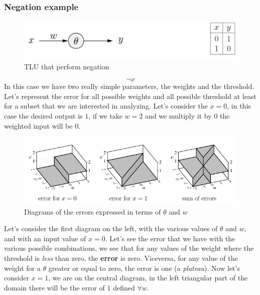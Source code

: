 \documentclass{article}
\begin{document}
\subsubsection{Negation example}
\begin{figure}[H]
    \centering
    \includegraphics[scale=1]{images/neg_example.png}
    \caption{TLU that perform negation}
    \label{fig:neg_example}
\end{figure}
$$\neg x$$
In this case we have two really simple parameters, the weights and the threshold.
Let’s represent the error for all possible weights and all possible threshold at least
for a subset that we are interested in analyzing. Let’s consider the $x=0$, in this case
the desired output is $1$, if we take $w=2$ and we multiply it by $0$ the weighted input
will be $0$.
\begin{figure}[H]
    \centering
    \includegraphics[scale=0.7]{images/errors_exampl.png}
    \caption{Diagrams of the errors expressed in terms of $\theta$ and $w$}
    \label{fig:neg_tlu_errors}
\end{figure}
Let's consider the first diagram on the left, with the various values of $\theta$ and $w$, and
with an input value of $x=0$.
Let's see the error that we have with the various possible combinations, we see that
for any values of the weight where the threshold is \textit{less} than zero, the \textbf{error}
is zero. Viceversa, for any value of the weight for a $\theta$ greater or equal to zero, the
error is one (a \textit{plateau}).
\newline\newline
Now let's consider $x=1$, we are on the central diagram, in the left triangular part
of the domain there will be the error of $1$ defined $\forall w$.
\newline\newline
\end{document}
